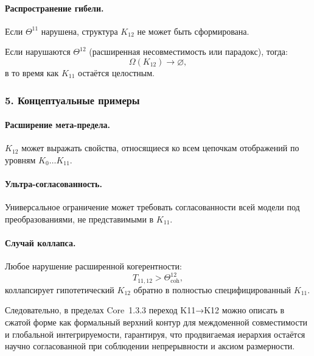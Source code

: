 \paragraph{Распространение гибели.}
Если $\Theta^{11}$ нарушена, структура $K_{12}$ не может быть сформирована.

Если нарушаются $\Theta^{12}$ (расширенная несовместимость или парадокс), тогда:
\[
\Omega(K_{12}) \rightarrow \varnothing,
\]
в то время как $K_{11}$ остаётся целостным.

\subsubsection{5. Концептуальные примеры}

\paragraph{Расширение мета-предела.}
$K_{12}$ может выражать свойства, относящиеся ко всем цепочкам отображений
по уровням $K_0\dots K_{11}$.

\paragraph{Ультра-согласованность.}
Универсальное ограничение может требовать согласованности всей модели под
преобразованиями, не представимыми в $K_{11}$.

\paragraph{Случай коллапса.}
Любое нарушение расширенной когерентности:
\[
T_{11,12} > \Theta^{12}_{\mathrm{coh}},
\]
коллапсирует гипотетический $K_{12}$ обратно в полностью специфицированный
$K_{11}$.

Следовательно, в пределах Core~1.3.3 переход K11→K12 можно описать в сжатой форме
как формальный верхний контур для междоменной совместимости и глобальной
интегрируемости, гарантируя, что продвигаемая иерархия остаётся научно
согласованной при соблюдении непрерывности и аксиом размерности.
